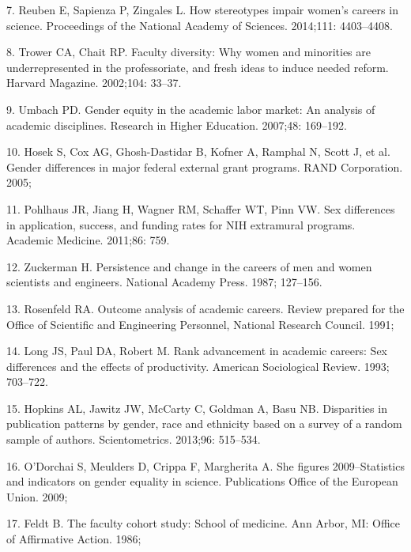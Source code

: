 \documentclass[12pt,]{article}
\begin{document}
\leavevmode\hypertarget{ref-Reuben_2014}{}%
7. Reuben E, Sapienza P, Zingales L. How stereotypes impair women's
careers in science. Proceedings of the National Academy of Sciences.
2014;111: 4403--4408.

\leavevmode\hypertarget{ref-Trower_2002}{}%
8. Trower CA, Chait RP. Faculty diversity: Why women and minorities are
underrepresented in the professoriate, and fresh ideas to induce needed
reform. Harvard Magazine. 2002;104: 33--37.

\leavevmode\hypertarget{ref-Umbach_2007}{}%
9. Umbach PD. Gender equity in the academic labor market: An analysis of
academic disciplines. Research in Higher Education. 2007;48: 169--192.

\leavevmode\hypertarget{ref-Hosek_2005}{}%
10. Hosek S, Cox AG, Ghosh-Dastidar B, Kofner A, Ramphal N, Scott J, et
al. Gender differences in major federal external grant programs. RAND
Corporation. 2005;

\leavevmode\hypertarget{ref-pohlhaus_2011}{}%
11. Pohlhaus JR, Jiang H, Wagner RM, Schaffer WT, Pinn VW. Sex
differences in application, success, and funding rates for NIH
extramural programs. Academic Medicine. 2011;86: 759.

\leavevmode\hypertarget{ref-Zuckerman_1987}{}%
12. Zuckerman H. Persistence and change in the careers of men and women
scientists and engineers. National Academy Press. 1987; 127--156.

\leavevmode\hypertarget{ref-Rosenfeld_1991}{}%
13. Rosenfeld RA. Outcome analysis of academic careers. Review prepared
for the Office of Scientific and Engineering Personnel, National
Research Council. 1991;

\leavevmode\hypertarget{ref-Long_1993}{}%
14. Long JS, Paul DA, Robert M. Rank advancement in academic careers:
Sex differences and the effects of productivity. American Sociological
Review. 1993; 703--722.

\leavevmode\hypertarget{ref-Hopkins_2013}{}%
15. Hopkins AL, Jawitz JW, McCarty C, Goldman A, Basu NB. Disparities in
publication patterns by gender, race and ethnicity based on a survey of
a random sample of authors. Scientometrics. 2013;96: 515--534.

\leavevmode\hypertarget{ref-ODorchai_2009}{}%
16. O'Dorchai S, Meulders D, Crippa F, Margherita A. She figures
2009--Statistics and indicators on gender equality in science.
Publications Office of the European Union. 2009;

\leavevmode\hypertarget{ref-Feldt_1986}{}%
17. Feldt B. The faculty cohort study: School of medicine. Ann Arbor,
MI: Office of Affirmative Action. 1986;
\end{document}
